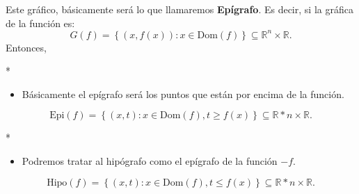 \begin{paracol}{2}
Este gráfico, básicamente será lo que llamaremos \textbf{Epígrafo}. Es decir, si la gráfica de la función es:
$$G(f)=\left\{(x,f(x)):x\in\text{Dom}(f)\right\}\subseteq \mathbb{R}^n\times \mathbb{R}.$$
Entonces,

\switchcolumn[1]*{\noindent\scriptsize
	\begin{itemize}
	    \item Básicamente el epígrafo será los puntos que están por encima de la función.
	\end{itemize}
}
\switchcolumn[0]\noindent
\begin{def.}[Epígrafo]
    $$\text{Epi}(f)=\left\{(x,t):x\in \text{Dom}(f),t\geq f(x)\right\}\subseteq \mathbb{R}* n\times \mathbb{R}.$$
\end{def.}

\switchcolumn[1]*{\noindent\scriptsize
	\begin{itemize}
	    \item Podremos tratar al hipógrafo como el epígrafo de la función $-f$.
	\end{itemize}
}
\switchcolumn[0]\noindent
\begin{def.}[Hipógrafo]
    $$\text{Hipo}(f)=\left\{(x,t):x\in \text{Dom}(f),t\leq f(x)\right\}\subseteq \mathbb{R}* n\times \mathbb{R}.$$
\end{def.}


\end{paracol}
